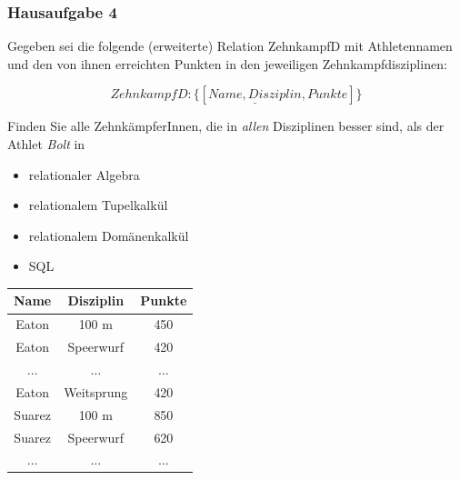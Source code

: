 \begin{frame}[fragile]
	\frametitle{Hausaufgabe 4}
	\vspace{0.5cm}

	\begin{multicols}{2}
		Gegeben sei die folgende (erweiterte) Relation ZehnkampfD mit 
		Athletennamen und den von ihnen erreichten Punkten in den jeweiligen Zehnkampfdisziplinen:

		\[ ZehnkampfD: \{[ \underline{Name, Disziplin}, Punkte ]\} \]

		Finden Sie alle ZehnkämpferInnen, die in \textit{allen} Disziplinen besser sind,
		als der Athlet \textit{Bolt} in
		\begin{itemize}
			\item relationaler Algebra
			\item relationalem Tupelkalkül
			\item relationalem Domänenkalkül
			\item SQL
		\end{itemize}
		\vfill\columnbreak

		\begin{table}[]
			\begin{tabular}{c|c|c}
				Name         & Disziplin    & Punkte      \\ \hline
				Eaton        & 100 m        & 450         \\
				Eaton        & Speerwurf    & 420         \\
				\( \hdots \) & \( \hdots \) & \( \hdots\) \\
				Eaton        & Weitsprung   & 420         \\
				Suarez       & 100 m        & 850         \\
				Suarez       & Speerwurf    & 620         \\
				\( \hdots \) & \( \hdots \) & \( \hdots\) \\
			\end{tabular}
		\end{table}
	\end{multicols}
\end{frame}

